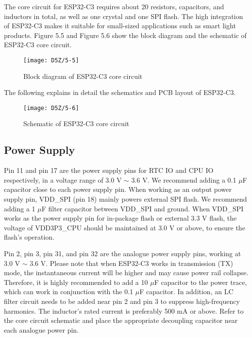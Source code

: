 \documentclass[a4paper,12pt]{book}
\begin{document}

The core circuit for ESP32-C3 requires about 20 resistors, capacitors, and inductors in total, as well as one crystal and one SPI flash. The high integration of ESP32-C3 makes it suitable for small-sized applications such as smart light products. Figure 5.5 and Figure 5.6 show the block diagram and the schematic of ESP32-C3 core circuit.

\begin{figure}[h!]
    \centering
    \texttt{[image: D5Z/5-5]}
    \caption{Block diagram of ESP32-C3 core circuit}
\end{figure}

The following explains in detail the schematics and PCB layout of ESP32-C3.

\begin{figure}[h!]
    \centering
    \texttt{[image: D5Z/5-6]}
    \caption{Schematic of ESP32-C3 core circuit}
\end{figure}

\subsection{Power Supply}
Pin 11 and pin 17 are the power supply pins for RTC IO and CPU IO respectively, in a voltage range of 3.0 V $\sim$ 3.6 V. We recommend adding a 0.1 $\mu$F capacitor close to each power supply pin. When working as an output power supply pin, VDD\_SPI (pin 18) mainly powers external SPI flash. We recommend adding a 1 $\mu$F filter capacitor between VDD\_SPI and ground. When VDD\_SPI works as the power supply pin for in-package flash or external 3.3 V flash, the voltage of VDD3P3\_CPU should be maintained at 3.0 V or above, to ensure the flash’s operation.

Pin 2, pin 3, pin 31, and pin 32 are the analogue power supply pins, working at 3.0 V $\sim$ 3.6 V. Please note that when ESP32-C3 works in transmission (TX) mode, the instantaneous current will be higher and may cause power rail collapse. Therefore, it is highly recommended to add a 10 $\mu$F capacitor to the power trace, which can work in conjunction with the 0.1 $\mu$F capacitor. In addition, an LC filter circuit needs to be added near pin 2 and pin 3 to suppress high-frequency harmonics. The inductor’s rated current is preferably 500 mA or above. Refer to the core circuit schematic and place the appropriate decoupling capacitor near each analogue power pin.
\end{document}
